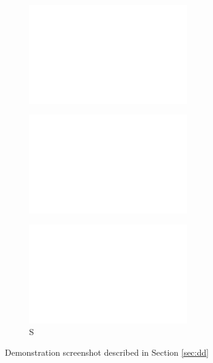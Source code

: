 \begin{figure}[t]
\begin{subfigure}{0.33\linewidth}
\hspace{-.6cm} \includegraphics[height=4.3cm,width=1.2\linewidth]{Figures/dummy.png}
\caption{\scriptsize }
\label{sfig:testaa}
\end{subfigure}\hfill
\begin{subfigure}{0.33\linewidth}
\centering
\hspace*{-.23cm} \includegraphics[height=4.3cm,width=1.1\linewidth]{Figures/dummy.png}
\caption{\scriptsize }
\label{sfig:testbb}
\end{subfigure}\hfill
\begin{subfigure}{0.33\linewidth}
\centering
\hspace{-.3cm}\includegraphics[height=4.3cm,width=1.1\linewidth]{Figures/dummy.png}
\caption{\scriptsize S}
\label{fig:push}
\end{subfigure}\hfill
\caption{Demonstration screenshot described in Section \ref{sec:dd}}
\label{fig:inteface}
		\vspace{-0.3cm}
\end{figure}



